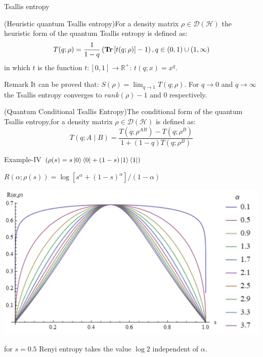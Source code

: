 \documentclass{beamer}
\begin{document}
\begin{frame}{Tsallis entropy}
\begin{scriptsize}
\begin{definition}(Heuristic quantum Tsallis entropy)For a density matrix $\rho \in \mathcal{D}(\mathcal{H})$ the heuristic form of the quantum Tsallis entropy is defined as:
\begin{equation*}
T(q ; \rho)= \frac{1}{1-q}\left(\operatorname{\textup{\textbf{Tr}}} \left[t(q;\rho)\right]-1\right), q \in(0,1) \cup(1, \infty)
\end{equation*}
in which $t$ is the function $t:[0,1] \rightarrow \mathbb{R^{+}}$: $t(q;x)=x^{q}$.
\end{definition}
\begin{alertblock}{Remark}
It can be proved that: $S(\rho)=\lim _{q \rightarrow 1} T(q;\rho)$. For $q \to 0$ and $q \to \infty$ the Tsallis entropy converges to $rank(\rho)-1$ and 0 respectively.
\end{alertblock}
\begin{definition}(Quantum Conditional Tsallis Entropy)The conditional form of the quantum Tsallis entropy,for a density matrix $\rho \in \mathcal{D}(\mathcal{H})$ is defined as:
\begin{equation*}
T(q;A \mid B)=\frac{T(q;\rho^{AB})-T(q;\rho^B)}{1+(1-q) T(q;\rho^{B})}
\end{equation*}
\end{definition}
\end{scriptsize}
\end{frame}

\begin{frame}{Example-IV $\left(\rho(s) = s \ket{0} \bra{0} + (1-s) \ket{1} \bra{1}\right)$}
\begin{scriptsize}
$
R(\alpha;\rho(s))=
\log \left[ s^{\alpha }+(1-s)^{\alpha } \right]/(1-\alpha)
$
\begin{center}
\includegraphics[scale=0.45]{figures/renyi_ent_plot.png}
\end{center}
for $s=0.5$ Renyi entropy takes the value $\log2$ independent of $\alpha$.
\end{scriptsize}
\end{frame}
\end{document}
